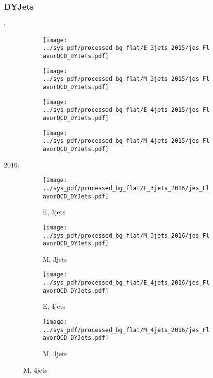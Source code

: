 \documentclass{beamer}
\begin{document}
\begin{frame}
\frametitle{DYJets}
\fontsize{5}{1}:
\begin{figure}
\centering
\begin{subfigure}[b]{0.24\textwidth}
\texttt{[image: ../sys\_pdf/processed\_bg\_flat/E\_3jets\_2015/jes\_FlavorQCD\_DYJets.pdf]}
\end{subfigure}
\begin{subfigure}[b]{0.24\textwidth}
\texttt{[image: ../sys\_pdf/processed\_bg\_flat/M\_3jets\_2015/jes\_FlavorQCD\_DYJets.pdf]}
\end{subfigure}
\begin{subfigure}[b]{0.24\textwidth}
\texttt{[image: ../sys\_pdf/processed\_bg\_flat/E\_4jets\_2015/jes\_FlavorQCD\_DYJets.pdf]}
\end{subfigure}
\begin{subfigure}[b]{0.24\textwidth}
\texttt{[image: ../sys\_pdf/processed\_bg\_flat/M\_4jets\_2015/jes\_FlavorQCD\_DYJets.pdf]}
\end{subfigure}
\end{figure}
2016:
\begin{figure}
\centering
\begin{subfigure}[b]{0.24\textwidth}
\texttt{[image: ../sys\_pdf/processed\_bg\_flat/E\_3jets\_2016/jes\_FlavorQCD\_DYJets.pdf]}
\captionsetup{font=tiny}
\caption{E, 3jets}
\end{subfigure}
\begin{subfigure}[b]{0.24\textwidth}
\texttt{[image: ../sys\_pdf/processed\_bg\_flat/M\_3jets\_2016/jes\_FlavorQCD\_DYJets.pdf]}
\captionsetup{font=tiny}
\caption{M, 3jets}
\end{subfigure}
\begin{subfigure}[b]{0.24\textwidth}
\texttt{[image: ../sys\_pdf/processed\_bg\_flat/E\_4jets\_2016/jes\_FlavorQCD\_DYJets.pdf]}
\captionsetup{font=tiny}
\caption{E, 4jets}
\end{subfigure}
\begin{subfigure}[b]{0.24\textwidth}
\texttt{[image: ../sys\_pdf/processed\_bg\_flat/M\_4jets\_2016/jes\_FlavorQCD\_DYJets.pdf]}
\captionsetup{font=tiny}
\caption{M, 4jets}
\end{subfigure}
\end{figure}
\end{frame}
\end{document}
